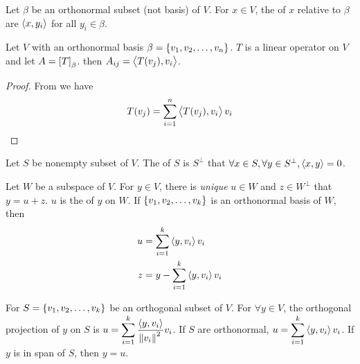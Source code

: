 \begin{definition}
    Let $\beta$ be an orthonormal subset (not basis) of $V$. For $x \in V$, the  of $x$ relative to $\beta$ are $\left\langle \displaystyle x, y_i \right\rangle$ for all $y_i \in \beta$.
\end{definition}


\begin{theorem}\label{matrixelementasinnerproductresult}
	Let $V$ with an orthonormal basis $\beta=\set{v_1,v_2,\dots,v_n}$. $T$ is a linear operator on $V$ and let $A= \coordinate{T}_\beta$. then $A_{ij}=\left\langle \displaystyle T(v_j), v_i \right\rangle$.
\end{theorem}
\begin{proof}
	From  we have
	\begin{equation*}
		T(v_j) = \sum_{i=1}^n \left\langle \displaystyle T(v_j), v_i \right\rangle v_i
	\end{equation*}
\end{proof}

\begin{definition}
    Let $S$ be nonempty subset of $V$. The  of $S$ is $S^\bot$ that $\forall x \in S, \forall y \in S^\bot, \left\langle \displaystyle x, y \right\rangle = 0$.
\end{definition}

\begin{theorem}\label{orthogonalprojection}
    Let $W$ be a subspace of $V$. For $y \in V$, there is \emph{unique} $u \in W$ and $z \in W^\bot$ that $y = u + z$. $u$ is the  of $y$ on $W$. If $\set{v_1, v_2, \dots, v_k}$ is an orthonormal basis of $W$, then 
    \begin{equation}
        \begin{aligned}
            u &= \sum_{i=1}^k \left\langle \displaystyle y, v_i \right\rangle v_i \\
            z &= y -   \sum_{i=1}^k \left\langle \displaystyle y, v_i \right\rangle v_i          
        \end{aligned}
    \end{equation}
\end{theorem}


\begin{theorem}
    For $S=\set{v_1, v_2, \dots, v_k}$ be an orthogonal subset of $V$. For $\forall y \in V$, the orthogonal projection of $y$ on $S$ is $\displaystyle u = \sum_{i=1}^k \frac{\left\langle \displaystyle y, v_i \right\rangle}{\norm{v_i}^2} v_i$. If $S$ are orthonormal, $\displaystyle u = \sum_{i=1}^k \left\langle \displaystyle y, v_i \right\rangle v_i$. If $y$ is in span of $S$, then $y = u$.
\end{theorem}



